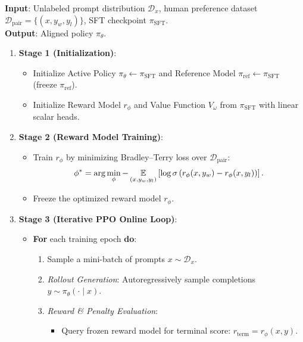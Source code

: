 \documentclass[../../../main.tex]{subfiles}
\begin{document}
\begin{tcolorbox}[colback=cardBg,colframe=cardLine,arc=2pt,boxrule=0.5pt,title=\textbf{Algorithmic Pipeline: Complete Execution Workflow of PPO-RLHF}]
\label{box:rlhf_algorithmic_pipeline}
\small\sffamily
\textbf{Input}: Unlabeled prompt distribution $\mathcal{D}_x$, human preference dataset $\mathcal{D}_{\text{pair}} = \{(x, y_w, y_l)\}$, SFT checkpoint $\pi_{\text{SFT}}$.\\
\textbf{Output}: Aligned policy $\pi_\theta$.
\begin{enumerate}
    \item \textbf{Stage 1 (Initialization)}:
    \begin{itemize}
        \item Initialize Active Policy $\pi_\theta \leftarrow \pi_{\text{SFT}}$ and Reference Model $\pi_{\text{ref}} \leftarrow \pi_{\text{SFT}}$ (freeze $\pi_{\text{ref}}$).
        \item Initialize Reward Model $r_\phi$ and Value Function $V_\omega$ from $\pi_{\text{SFT}}$ with linear scalar heads.
    \end{itemize}
    \item \textbf{Stage 2 (Reward Model Training)}:
    \begin{itemize}
        \item Train $r_\phi$ by minimizing Bradley--Terry loss over $\mathcal{D}_{\text{pair}}$:
        $$\phi^* = \arg\min_\phi -\operatorname*{\mathbb{E}}_{(x, y_w, y_l)} \left[ \log \sigma\left( r_\phi(x, y_w) - r_\phi(x, y_l) \right) \right].$$
        \item Freeze the optimized reward model $r_\phi$.
    \end{itemize}
    \item \textbf{Stage 3 (Iterative PPO Online Loop)}:
    \begin{itemize}
        \item \textbf{For} each training epoch \textbf{do}:
        \begin{enumerate}
            \item Sample a mini-batch of prompts $x \sim \mathcal{D}_x$.
            \item \textit{Rollout Generation}: Autoregressively sample completions $y \sim \pi_\theta(\cdot \mid x)$.
            \item \textit{Reward \& Penalty Evaluation}:
            \begin{itemize}
                \item Query frozen reward model for terminal score: $r_{\text{term}} = r_\phi(x, y)$.

\end{itemize}
\end{enumerate}
\end{itemize}
\end{enumerate}
\end{tcolorbox}
\end{document}
